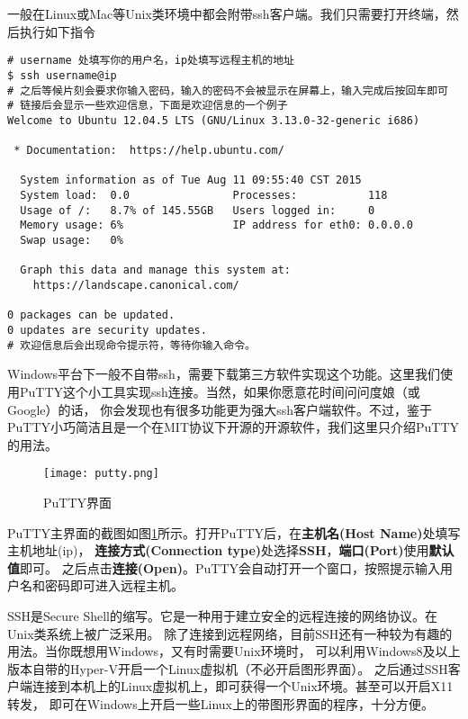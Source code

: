 一般在Linux或Mac等Unix类环境中都会附带ssh客户端。我们只需要打开终端，然后执行如下指令

\begin{verbatim}
# username 处填写你的用户名，ip处填写远程主机的地址
$ ssh username@ip
# 之后等候片刻会要求你输入密码，输入的密码不会被显示在屏幕上，输入完成后按回车即可
# 链接后会显示一些欢迎信息，下面是欢迎信息的一个例子
Welcome to Ubuntu 12.04.5 LTS (GNU/Linux 3.13.0-32-generic i686)

 * Documentation:  https://help.ubuntu.com/

  System information as of Tue Aug 11 09:55:40 CST 2015
  System load:  0.0                Processes:           118
  Usage of /:   8.7% of 145.55GB   Users logged in:     0
  Memory usage: 6%                 IP address for eth0: 0.0.0.0
  Swap usage:   0%

  Graph this data and manage this system at:
    https://landscape.canonical.com/

0 packages can be updated.
0 updates are security updates.
# 欢迎信息后会出现命令提示符，等待你输入命令。
\end{verbatim}

Windows平台下一般不自带ssh，需要下载第三方软件实现这个功能。这里我们使用PuTTY这个小工具实现ssh连接。当然，如果你愿意花时间问问度娘（或Google）的话，
你会发现也有很多功能更为强大ssh客户端软件。不过，鉴于PuTTY小巧简洁且是一个在MIT协议下开源的开源软件，我们这里只介绍PuTTY的用法。

\begin{figure}[htbp]
  \centering
  \texttt{[image: putty.png]}
  \caption{PuTTY界面}\label{fig:putty} 
\end{figure}

PuTTY主界面的截图如图\ref{fig:putty}所示。打开PuTTY后，在\textbf{主机名(Host Name)}处填写主机地址(ip)，
\textbf{连接方式(Connection type)}处选择\textbf{SSH}，\textbf{端口(Port)}使用\textbf{默认值}即可。
之后点击\textbf{连接(Open)}。PuTTY会自动打开一个窗口，按照提示输入用户名和密码即可进入远程主机。

\begin{note}
SSH是Secure Shell的缩写。它是一种用于建立安全的远程连接的网络协议。在Unix类系统上被广泛采用。
除了连接到远程网络，目前SSH还有一种较为有趣的用法。当你既想用Windows，又有时需要Unix环境时，
可以利用Windows8及以上版本自带的Hyper-V开启一个Linux虚拟机（不必开启图形界面）。
之后通过SSH客户端连接到本机上的Linux虚拟机上，即可获得一个Unix环境。甚至可以开启X11转发，
即可在Windows上开启一些Linux上的带图形界面的程序，十分方便。
\end{note}


